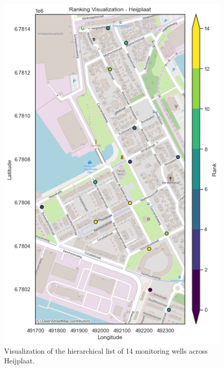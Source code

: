\begin{figure}
    \centering
    \includegraphics[width=0.75\linewidth]{frontmatter/Heijplaat-fig/rankheij.png}
    \caption{Visualization of the hierarchical list of 14 monitoring wells across Heijplaat.}    
    \label{rankheij}
\end{figure}

\clearpage

